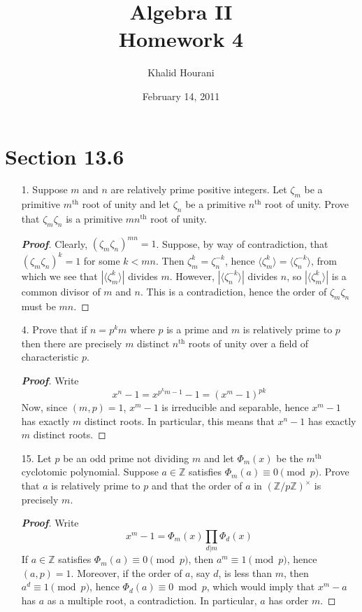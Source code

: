 \documentclass[12pt,leqno]{article}
\title{Algebra II\\\large Homework 4}
\date{February 14, 2011}
\author{Khalid Hourani}
\theoremstyle{definition}
\newcommand{\Z}{\mathbb{Z}}
\newenvironment{Proof}{\begin{proof}[\textnormal{\textbf{Proof}}]}{\end{proof}}
\begin{document}
 \begin{titlepage}
  \maketitle
 \end{titlepage}

\section*{Section 13.6}
  \begin{enumerate}
   \item [1.] Suppose $m$ and $n$ are relatively prime positive integers. Let $\zeta_m$ be a primitive $m^{\text{th}}$ root of unity and let $\zeta_n$ be a primitive $n^{\text{th}}$ root of unity. Prove that $\zeta_m\zeta_n$ is a primitive $mn^{\text{th}}$ root of unity.
    \begin{Proof}
    Clearly, $(\zeta_m\zeta_n)^{mn}=1$. Suppose, by way of contradiction, that $(\zeta_m\zeta_n)^k=1$ for some $k<mn$. Then $\zeta_m^k=\zeta_n^{-k}$, hence $\langle\zeta_m^k\rangle=\langle\zeta_n^{-k}\rangle$, from which we see that $|\langle\zeta_m^k\rangle|$ divides $m$. However, $|\langle\zeta_n^{-k}\rangle|$ divides $n$, so $|\langle\zeta_m^k\rangle|$ is a common divisor of $m$ and $n$. This is a contradiction, hence the order of $\zeta_m\zeta_n$ must be $mn$.
    \end{Proof}
   \item [4.] Prove that if $n=p^km$ where $p$ is a prime and $m$ is relatively prime to $p$ then there are precisely $m$ distinct $n^{\text{th}}$ roots of unity over a field of characteristic $p$.
    \begin{Proof}
     Write \[x^n-1=x^{p^km-1}-1=(x^m-1)^{pk}\] Now, since $(m,p)=1$, $x^m-1$ is irreducible and separable, hence $x^m-1$ has exactly $m$ distinct roots. In particular, this means that $x^n-1$ has exactly $m$ distinct roots.
    \end{Proof}
   \item [15.] Let $p$ be an odd prime not dividing $m$ and let $\varPhi_m(x)$ be the $m^{\text{th}}$ cyclotomic polynomial. Suppose $a\in\Z$ satisfies $\varPhi_m(a)\equiv0\pmod{p}$. Prove that $a$ is relatively prime to $p$ and that the order of $a$ in $(\Z/p\Z)^{\times}$ is precisely $m$.
    \begin{Proof}
     Write \[x^m-1=\varPhi_m(x)\prod_{d|m}\varPhi_d(x)\] If $a\in\Z$ satisfies $\varPhi_m(a)\equiv0\pmod{p}$, then $a^m\equiv1\pmod{p}$, hence $(a,p)=1$. Moreover, if the order of $a$, say $d$, is less than $m$, then $a^d\equiv1\pmod{p}$, hence $\varPhi_d(a)\equiv0\bmod{p}$, which would imply that $x^m-a$ has $a$ as a multiple root, a contradiction. In particular, $a$ has order $m$. 

\end{Proof}
\end{enumerate}
\end{document}
